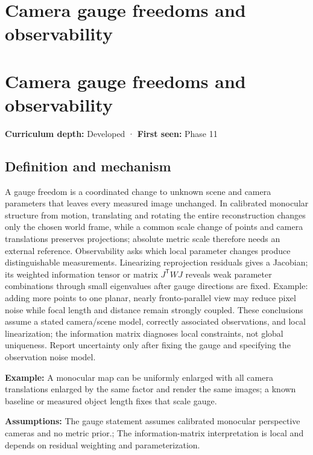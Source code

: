 \hypertarget{appendix-113f0267e5f4}{}
\section*{Camera gauge freedoms and observability}
\section{Camera gauge freedoms and observability}\label{camera-gauge-freedoms-and-observability}

\textbf{Curriculum depth:} Developed · \textbf{First seen:} Phase 11

\subsection{Definition and mechanism}\label{definition-and-mechanism}

A gauge freedom is a coordinated change to unknown scene and camera parameters that leaves every measured image unchanged. In calibrated monocular structure from motion, translating and rotating the entire reconstruction changes only the chosen world frame, while a common scale change of points and camera translations preserves projections; absolute metric scale therefore needs an external reference. Observability asks which local parameter changes produce distinguishable measurements. Linearizing reprojection residuals gives a Jacobian; its weighted information tensor or matrix \(J^{\mathsf T}WJ\) reveals weak parameter combinations through small eigenvalues after gauge directions are fixed. Example: adding more points to one planar, nearly fronto-parallel view may reduce pixel noise while focal length and distance remain strongly coupled. These conclusions assume a stated camera/scene model, correctly associated observations, and local linearization; the information matrix diagnoses local constraints, not global uniqueness. Report uncertainty only after fixing the gauge and specifying the observation noise model.

\textbf{Example:} A monocular map can be uniformly enlarged with all camera translations enlarged by the same factor and render the same images; a known baseline or measured object length fixes that scale gauge.

\textbf{Assumptions:} The gauge statement assumes calibrated monocular perspective cameras and no metric prior.; The information-matrix interpretation is local and depends on residual weighting and parameterization.

